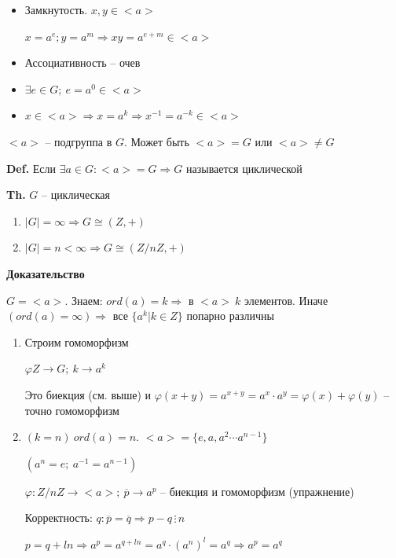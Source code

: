 \documentclass[14pt, letter paper]{article}
\begin{document}
\begin{itemize}
    \item Замкнутость. $x, y \in <a>$

    $x = a^e; y = a^m \Rightarrow xy = a^{e+m} \in <a>$

    \item Ассоциативность -- очев

    \item $\exists e \in G;\ e = a^0 \in <a>$

    \item $x \in <a> \Rightarrow x = a^k \Rightarrow x^{-1} = a^{-k} \in <a>$
\end{itemize}

\vspace{5mm}

$<a>$ -- подгруппа в $G$. Может быть $<a> = G$ или $<a> \neq G$

\textbf{Def.} Если $\exists a \in G : <a> = G \Rightarrow G$ называется циклической

\textbf{Th.} $G$ -- циклическая

\begin{enumerate}
    \item $|G| = \infty \Rightarrow G \cong (Z, +)$

    \item $|G| = n < \infty \Rightarrow G \cong (Z/nZ, +)$
\end{enumerate}

\begin{center}
    \textbf{Доказательство}
\end{center}

$G = <a>$. Знаем: $ord(a) = k \Rightarrow$ в $<a>\ k$ элементов. Иначе $(ord(a) = \infty) \Rightarrow$ все $\{a^k| k \in Z\}$ попарно различны

\begin{enumerate}
    \item Строим гомоморфизм

    $\varphi Z \rightarrow G;\ k \rightarrow a^k$

    Это биекция (см. выше) и $\varphi(x + y) = a^{x + y} = a^x \cdot a^y = \varphi(x) + \varphi(y)$ -- точно гомоморфизм

    \item $(k = n)\ ord(a) = n$. $<a> = \{ e, a, a^2 \cdots a^{n-1}\}$

    $(a^n = e;\ a^{-1} = a^{n-1})$

    $\varphi : Z/nZ \rightarrow <a>;\ \overline{p} \rightarrow a^p$ -- биекция и гомоморфизм (упражнение)

    Корректность: $q : \overline{p} = \overline{q} \Rightarrow p - q \, \vdots \, n$

    $p = q + ln \Rightarrow a^p = a^{q + ln} = a^q \cdot (a^n)^l = a^q \Rightarrow a^p = a^q$
\end{enumerate}
\end{document}
